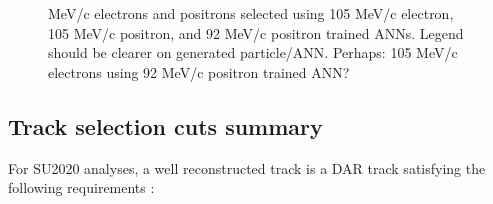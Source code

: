 \begin{figure}
  \caption{
    \label{fig:su2020_mva_test_dar} 
    { MeV/c electrons and positrons selected using 105 MeV/c electron, 105 MeV/c positron,
      and 92 MeV/c positron trained ANNs.}
    {\blue Legend should be clearer on generated particle/ANN. Perhaps: 105 MeV/c electrons using 92 MeV/c positron trained ANN?}
  }
\end{figure}


\subsection{Track selection cuts summary}
\label{sec:track-selection_cuts_summary}
  
For SU2020 analyses, a well reconstructed track is a DAR track satisfying the following requirements {\blue :}

